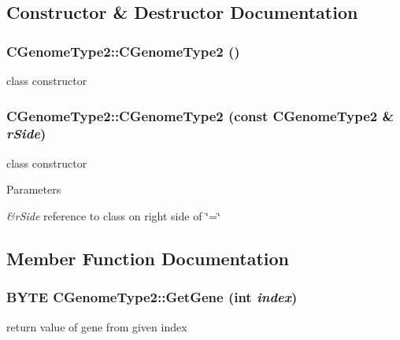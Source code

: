 \subsection{Constructor \& Destructor Documentation}
\hypertarget{classCGenomeType2_a49dcf0302d8e83d51025c31fc07ee502}{
\subsubsection[{CGenomeType2}]{\setlength{\rightskip}{0pt plus 5cm}CGenomeType2::CGenomeType2 ()}}
\label{classCGenomeType2_a49dcf0302d8e83d51025c31fc07ee502}
class constructor \hypertarget{classCGenomeType2_ac58b7ab43d29dac0816e25ccf4e7ccd4}{
\subsubsection[{CGenomeType2}]{\setlength{\rightskip}{0pt plus 5cm}CGenomeType2::CGenomeType2 (const {\bf CGenomeType2} \& {\em rSide})}}
\label{classCGenomeType2_ac58b7ab43d29dac0816e25ccf4e7ccd4}
class constructor


\begin{DoxyParams}{Parameters}
\item[{\em \&rSide}]reference to class on right side of \char`\"{}=\char`\"{} \end{DoxyParams}


\subsection{Member Function Documentation}
\hypertarget{classCGenomeType2_adecff806abe734ca910115bc849046aa}{
\subsubsection[{GetGene}]{\setlength{\rightskip}{0pt plus 5cm}BYTE CGenomeType2::GetGene (int {\em index})}}
\label{classCGenomeType2_adecff806abe734ca910115bc849046aa}
return value of gene from given index


